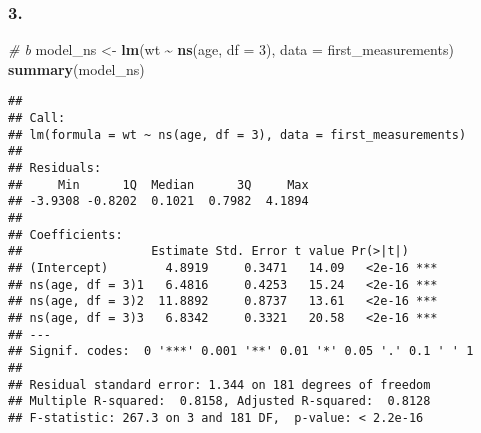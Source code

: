 \documentclass[
]{article}
\newenvironment{Shaded}{\begin{snugshade}}{\end{snugshade}}
\newcommand{\AttributeTok}[1]{\textcolor[rgb]{0.13,0.29,0.53}{#1}}
\newcommand{\CommentTok}[1]{\textcolor[rgb]{0.56,0.35,0.01}{\textit{#1}}}
\newcommand{\DecValTok}[1]{\textcolor[rgb]{0.00,0.00,0.81}{#1}}
\newcommand{\FunctionTok}[1]{\textcolor[rgb]{0.13,0.29,0.53}{\textbf{#1}}}
\newcommand{\NormalTok}[1]{#1}
\newcommand{\OtherTok}[1]{\textcolor[rgb]{0.56,0.35,0.01}{#1}}
\newcommand{\SpecialCharTok}[1]{\textcolor[rgb]{0.81,0.36,0.00}{\textbf{#1}}}
\begin{document}
\subsubsection{3.}\label{section-5}

\begin{Shaded}
\begin{Highlighting}[]
\CommentTok{\# b}
\NormalTok{model\_ns }\OtherTok{\textless{}{-}} \FunctionTok{lm}\NormalTok{(wt }\SpecialCharTok{\textasciitilde{}} \FunctionTok{ns}\NormalTok{(age, }\AttributeTok{df =} \DecValTok{3}\NormalTok{), }\AttributeTok{data =}\NormalTok{ first\_measurements)}
\FunctionTok{summary}\NormalTok{(model\_ns)}
\end{Highlighting}
\end{Shaded}

\begin{verbatim}
## 
## Call:
## lm(formula = wt ~ ns(age, df = 3), data = first_measurements)
## 
## Residuals:
##     Min      1Q  Median      3Q     Max 
## -3.9308 -0.8202  0.1021  0.7982  4.1894 
## 
## Coefficients:
##                  Estimate Std. Error t value Pr(>|t|)    
## (Intercept)        4.8919     0.3471   14.09   <2e-16 ***
## ns(age, df = 3)1   6.4816     0.4253   15.24   <2e-16 ***
## ns(age, df = 3)2  11.8892     0.8737   13.61   <2e-16 ***
## ns(age, df = 3)3   6.8342     0.3321   20.58   <2e-16 ***
## ---
## Signif. codes:  0 '***' 0.001 '**' 0.01 '*' 0.05 '.' 0.1 ' ' 1
## 
## Residual standard error: 1.344 on 181 degrees of freedom
## Multiple R-squared:  0.8158, Adjusted R-squared:  0.8128 
## F-statistic: 267.3 on 3 and 181 DF,  p-value: < 2.2e-16
\end{verbatim}
\end{document}
